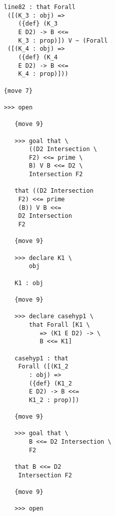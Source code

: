 \documentclass[12pt]{article}
\begin{document}
\begin{verbatim}
                        line82 : that Forall 
                         ([(K_3 : obj) => 
                            ({def} (K_3 
                            E D2) -> B <<= 
                            K_3 : prop)]) V ~ (Forall 
                         ([(K_4 : obj) => 
                            ({def} (K_4 
                            E D2) -> B <<= 
                            K_4 : prop)]))

                        {move 7}

                        >>> open

                           {move 9}

                           >>> goal that \
                               ((D2 Intersection \
                               F2) <<= prime \
                               B) V B <<= D2 \
                               Intersection F2

                           that ((D2 Intersection 
                            F2) <<= prime 
                            (B)) V B <<= 
                            D2 Intersection 
                            F2

                           {move 9}

                           >>> declare K1 \
                               obj

                           K1 : obj

                           {move 9}

                           >>> declare casehyp1 \
                               that Forall [K1 \
                                  => (K1 E D2) -> \
                                  B <<= K1]

                           casehyp1 : that 
                            Forall ([(K1_2 
                               : obj) => 
                               ({def} (K1_2 
                               E D2) -> B <<= 
                               K1_2 : prop)])

                           {move 9}

                           >>> goal that \
                               B <<= D2 Intersection \
                               F2

                           that B <<= D2 
                            Intersection F2

                           {move 9}

                           >>> open


\end{verbatim}
\end{document}
